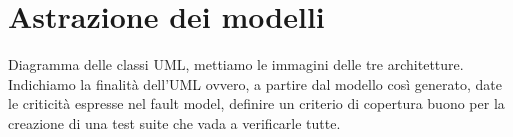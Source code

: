 \section{Astrazione dei modelli}

Diagramma delle classi UML, mettiamo le immagini delle tre architetture. 
Indichiamo la finalità dell'UML ovvero, a partire dal modello così generato, date le criticità espresse nel fault model, definire un criterio di copertura buono per la creazione di una test suite che vada a verificarle tutte.